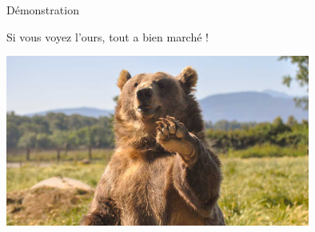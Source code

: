 \begin{frame}{Démonstration}
    \begin{block}{}
        Si vous voyez l'ours, tout a bien marché ! 
    \end{block}
    \pause
        \includegraphics[width=10cm]{img/bear.jpg}
\end{frame}
